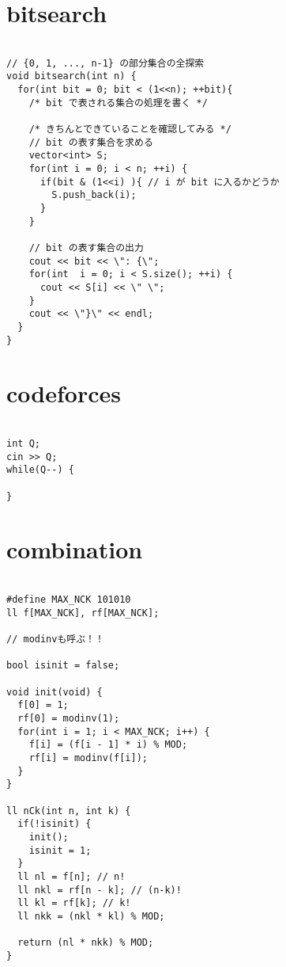 \documentclass[a4j,titlepage]{jarticle} %
\begin{document}
\section{bitsearch}
\color{black}
\begin{lstlisting}[caption=bitsearch]

// {0, 1, ..., n-1} の部分集合の全探索
void bitsearch(int n) {
  for(int bit = 0; bit < (1<<n); ++bit){
    /* bit で表される集合の処理を書く */
    
    /* きちんとできていることを確認してみる */
    // bit の表す集合を求める
    vector<int> S;
    for(int i = 0; i < n; ++i) {
      if(bit & (1<<i) ){ // i が bit に入るかどうか
        S.push_back(i);
      }
    }
    
    // bit の表す集合の出力
    cout << bit << \": {\";
    for(int  i = 0; i < S.size(); ++i) {
      cout << S[i] << \" \";
    }
    cout << \"}\" << endl;
  }
}

\end{lstlisting}

\color{white}
\section{codeforces}
\color{black}
\begin{lstlisting}[caption=codeforces]

int Q;
cin >> Q;
while(Q--) {
  
}

\end{lstlisting}

\color{white}
\section{combination}
\color{black}
\begin{lstlisting}[caption=combination]

#define MAX_NCK 101010
ll f[MAX_NCK], rf[MAX_NCK];

// modinvも呼ぶ！！

bool isinit = false;

void init(void) {
  f[0] = 1;
  rf[0] = modinv(1);
  for(int i = 1; i < MAX_NCK; i++) {
    f[i] = (f[i - 1] * i) % MOD;
    rf[i] = modinv(f[i]);
  }
}

ll nCk(int n, int k) {
  if(!isinit) {
    init();
    isinit = 1;
  }
  ll nl = f[n]; // n!
  ll nkl = rf[n - k]; // (n-k)!
  ll kl = rf[k]; // k!
  ll nkk = (nkl * kl) % MOD;

  return (nl * nkk) % MOD;
}

\end{lstlisting}
\end{document}
